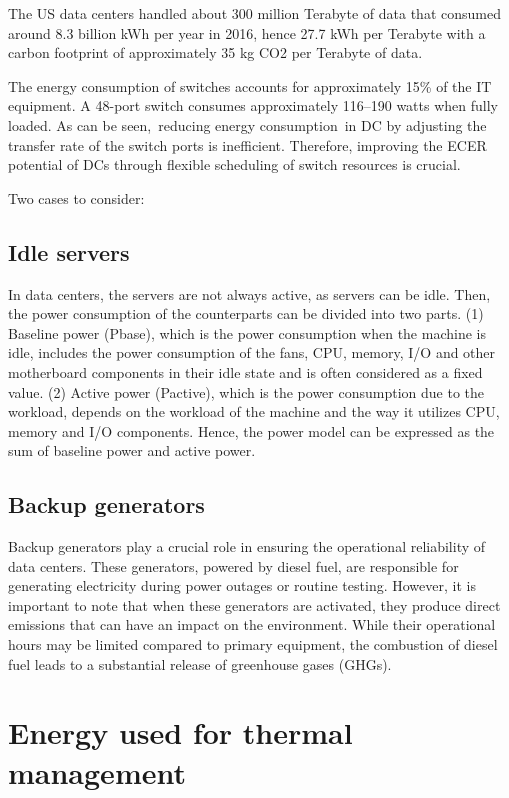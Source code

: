 \documentclass[
  a4paper,  %
  twoside,  %
  bibliography=totoc,
  headsepline,
  cleardoublepage=empty,
  parskip=half,
  draft=false
]{scrbook}
\begin{document}
The US data centers handled about 300 million Terabyte of data that consumed around 8.3 billion kWh per year in 2016, hence 27.7 kWh per Terabyte with a carbon footprint of approximately 35 kg CO2 per Terabyte
of data\cite{corbett2018sustainable}.

The energy consumption of switches accounts for approximately 15\% of the IT equipment. A 48-port switch consumes approximately 116–190 watts when fully loaded. As can be seen, reducing energy consumption in DC by adjusting the transfer rate of the switch ports is inefficient. Therefore, improving the ECER potential of DCs through flexible scheduling of switch resources is crucial\cite{ZHU2023104322}.


Two cases to consider:
\subsection{Idle servers}
In data centers, the servers are not always active, as servers can be idle. Then, the power consumption of the counterparts can be divided into two parts. (1) Baseline power (Pbase), which is the power consumption when the machine is idle, includes the power consumption of the fans, CPU, memory, I/O and other motherboard components in their idle state and is often considered as a fixed value. (2) Active power (Pactive), which is the power consumption due to the workload, depends on the workload of the machine and the way it utilizes CPU, memory and I/O components. Hence, the power model can be expressed as the sum of baseline power and active power. 

\subsection{Backup generators}
Backup generators play a crucial role in ensuring the operational reliability of data centers. These generators, powered by diesel fuel, are responsible for generating electricity during power outages or routine testing. However, it is important to note that when these generators are activated, they produce direct emissions that can have an impact on the environment. While their operational hours may be limited compared to primary equipment, the combustion of diesel fuel leads to a substantial release of greenhouse gases (GHGs).

\section{Energy used for thermal management}
\end{document}
